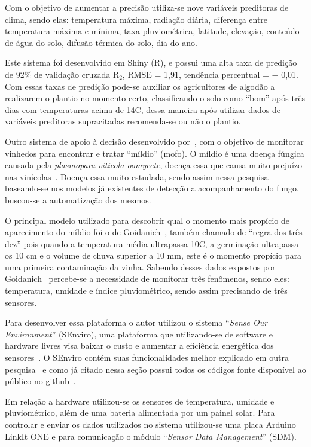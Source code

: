 \documentclass[
article,			%
12pt,				%
oneside,			%
a4paper,			%
english,			%
brazil,				%
sumario=tradicional
]{abntex2}
\begin{document}
Com o objetivo de aumentar a precisão utiliza-se nove variáveis preditoras de clima, sendo elas: temperatura máxima, radiação diária, diferença entre temperatura máxima e mínima, taxa pluviométrica, latitude, elevação, conteúdo de água do solo, difusão térmica do solo, dia do ano.

Este sistema foi desenvolvido em Shiny (R), e possui uma alta taxa de predição de 92\% de validação cruzada R$_{2}$, RMSE = 1,91, tendência percentual = $-$ 0,01.
Com essas taxas de predição pode-se auxiliar os agricultores de algodão a realizarem o plantio no momento certo, classificando o solo como ``bom'' após três dias com temperaturas acima de 14\textdegree C, dessa maneira após utilizar dados de variáveis preditoras supracitadas recomenda-se ou não o plantio.

Outro sistema de apoio à decisão desenvolvido por~\citeauthor{2}, com o objetivo de monitorar vinhedos para encontrar e tratar ``míldio'' (mofo).
O míldio é uma doença fúngica causada pela \textit{plasmopara viticola oomycete}, doença essa que causa muito prejuízo nas vinícolas~\cite{2}. Doença essa muito estudada, sendo assim nessa pesquisa baseando-se nos modelos já existentes de detecção a acompanhamento do fungo, buscou-se a automatização dos mesmos.

O principal modelo utilizado para descobrir qual o momento mais propício de aparecimento do míldio foi o de Goidanich~\cite{detectando_milidio}, também chamado de ``regra dos três dez'' pois quando a temperatura média ultrapassa 10\textdegree C, a germinação ultrapassa os 10 cm e o volume de chuva superior a 10 mm, este é o momento propício para uma primeira contaminação da vinha.
Sabendo desses dados expostos por Goidanich~\cite{detectando_milidio} percebe-se a necessidade de monitorar três fenômenos, sendo eles: temperatura, umidade e índice pluviométrico, sendo assim precisando de três sensores.

Para desenvolver essa plataforma o autor utilizou o sistema ``\textit{Sense Our Environment}'' (SEnviro), uma plataforma que utilizando-se de software e hardware livres visa baixar o custo e aumentar a eficiência energética dos sensores~\cite{2}. O SEnviro contém suas funcionalidades melhor explicado em outra pesquisa~\cite{SEnviro} e como já citado nessa seção possui todos os códigos fonte disponível ao público no github~\cite{SEnviro_Github}.

Em relação a hardware utilizou-se os sensores de temperatura, umidade e pluviométrico, além de uma bateria alimentada por um painel solar. Para controlar e enviar os dados utilizados no sistema utilizou-se uma placa Arduino LinkIt ONE e para comunicação o módulo ``\textit{Sensor Data Management}'' (SDM).
\end{document}
